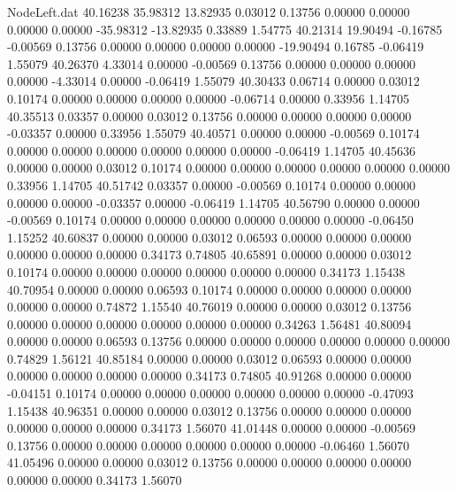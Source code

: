 \begin{filecontents}{NodeLeft.dat}
  40.16238   35.98312   13.82935     0.03012    0.13756    0.00000    0.00000    0.00000    0.00000  -35.98312  -13.82935    0.33889    1.54775
  40.21314   19.90494   -0.16785    -0.00569    0.13756    0.00000    0.00000    0.00000    0.00000  -19.90494    0.16785   -0.06419    1.55079
  40.26370    4.33014    0.00000    -0.00569    0.13756    0.00000    0.00000    0.00000    0.00000   -4.33014    0.00000   -0.06419    1.55079
  40.30433    0.06714    0.00000     0.03012    0.10174    0.00000    0.00000    0.00000    0.00000   -0.06714    0.00000    0.33956    1.14705
  40.35513    0.03357    0.00000     0.03012    0.13756    0.00000    0.00000    0.00000    0.00000   -0.03357    0.00000    0.33956    1.55079
  40.40571    0.00000    0.00000    -0.00569    0.10174    0.00000    0.00000    0.00000    0.00000    0.00000    0.00000   -0.06419    1.14705
  40.45636    0.00000    0.00000     0.03012    0.10174    0.00000    0.00000    0.00000    0.00000    0.00000    0.00000    0.33956    1.14705
  40.51742    0.03357    0.00000    -0.00569    0.10174    0.00000    0.00000    0.00000    0.00000   -0.03357    0.00000   -0.06419    1.14705
  40.56790    0.00000    0.00000    -0.00569    0.10174    0.00000    0.00000    0.00000    0.00000    0.00000    0.00000   -0.06450    1.15252
  40.60837    0.00000    0.00000     0.03012    0.06593    0.00000    0.00000    0.00000    0.00000    0.00000    0.00000    0.34173    0.74805
  40.65891    0.00000    0.00000     0.03012    0.10174    0.00000    0.00000    0.00000    0.00000    0.00000    0.00000    0.34173    1.15438
  40.70954    0.00000    0.00000     0.06593    0.10174    0.00000    0.00000    0.00000    0.00000    0.00000    0.00000    0.74872    1.15540
  40.76019    0.00000    0.00000     0.03012    0.13756    0.00000    0.00000    0.00000    0.00000    0.00000    0.00000    0.34263    1.56481
  40.80094    0.00000    0.00000     0.06593    0.13756    0.00000    0.00000    0.00000    0.00000    0.00000    0.00000    0.74829    1.56121
  40.85184    0.00000    0.00000     0.03012    0.06593    0.00000    0.00000    0.00000    0.00000    0.00000    0.00000    0.34173    0.74805
  40.91268    0.00000    0.00000    -0.04151    0.10174    0.00000    0.00000    0.00000    0.00000    0.00000    0.00000   -0.47093    1.15438
  40.96351    0.00000    0.00000     0.03012    0.13756    0.00000    0.00000    0.00000    0.00000    0.00000    0.00000    0.34173    1.56070
  41.01448    0.00000    0.00000    -0.00569    0.13756    0.00000    0.00000    0.00000    0.00000    0.00000    0.00000   -0.06460    1.56070
  41.05496    0.00000    0.00000     0.03012    0.13756    0.00000    0.00000    0.00000    0.00000    0.00000    0.00000    0.34173    1.56070

\end{filecontents}
